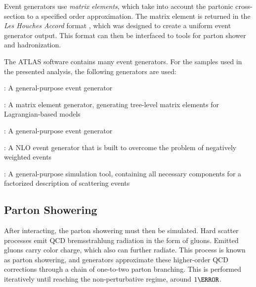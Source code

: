Event generators use \textit{matrix elements}, which take into account the partonic cross-section to a specified order approximation. The matrix element is returned in the \textit{Les Houches Accord} format \cite{les-houches}, which was designed to create a uniform event generator output. This format can then be interfaced to tools for parton shower and hadronization.

The ATLAS software contains many event generators. For the samples used in the presented analysis, the following generators are used:

\begin{description}
    \item \HERWIGpp: A general-purpose event generator \cite{herwigpp}
    \item \MADGRAPH: A matrix element generator, generating tree-level matrix elements for Lagrangian-based models \cite{mg5}
    \item \PYTHIA: A general-purpose event generator  \cite{pythia8.2}
    \item \POWHEG: A \gls{NLO} event generator that is built to overcome the problem of negatively weighted events \cite{powheg} %
    \item \SHERPA: A general-purpose simulation tool, containing all necessary components for a factorized description of scattering events \cite{sherpa2.2}
\end{description}


\subsection{Parton Showering} \label{ssec:partonshower} %
After interacting, the parton showering must then be simulated. Hard scatter processes emit \gls{QCD} bremsstrahlung radiation in the form of gluons. Emitted gluons carry color charge, which also can further radiate. This process is known as parton showering, and generators approximate these higher-order \gls{QCD} corrections through a chain of one-to-two parton branching. This is performed iteratively until reaching the non-perturbative regime, around $\unit{1}{\GeV}$.


